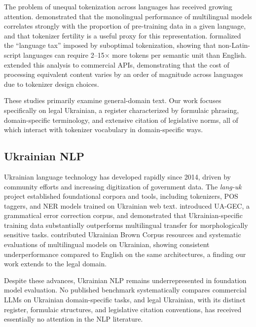 \documentclass[11pt,a4paper]{article}
\begin{document}
The problem of unequal tokenization across languages has received growing attention. \citet{rust2021good} demonstrated that the monolingual performance of multilingual models correlates strongly with the proportion of pre-training data in a given language, and that tokenizer fertility is a useful proxy for this representation. \citet{petrov2024language} formalized the ``language tax'' imposed by suboptimal tokenization, showing that non-Latin-script languages can require 2--15$\times$ more tokens per semantic unit than English. \citet{ahia2023all} extended this analysis to commercial APIs, demonstrating that the cost of processing equivalent content varies by an order of magnitude across languages due to tokenizer design choices.

These studies primarily examine general-domain text. Our work focuses specifically on legal Ukrainian, a register characterized by formulaic phrasing, domain-specific terminology, and extensive citation of legislative norms, all of which interact with tokenizer vocabulary in domain-specific ways.

\subsection{Ukrainian NLP}

Ukrainian language technology has developed rapidly since 2014, driven by community efforts and increasing digitization of government data. The \textit{lang-uk} project \citep{languk2018} established foundational corpora and tools, including tokenizers, POS taggers, and NER models trained on Ukrainian web text. \citet{syvokon2023uagec} introduced UA-GEC, a grammatical error correction corpus, and demonstrated that Ukrainian-specific training data substantially outperforms multilingual transfer for morphologically sensitive tasks. \citet{chaplynskyi2023ukrbruk} contributed Ukrainian Brown Corpus resources and systematic evaluations of multilingual models on Ukrainian, showing consistent underperformance compared to English on the same architectures, a finding our work extends to the legal domain.

Despite these advances, Ukrainian NLP remains underrepresented in foundation model evaluation. No published benchmark systematically compares commercial LLMs on Ukrainian domain-specific tasks, and legal Ukrainian, with its distinct register, formulaic structures, and legislative citation conventions, has received essentially no attention in the NLP literature.
\end{document}
